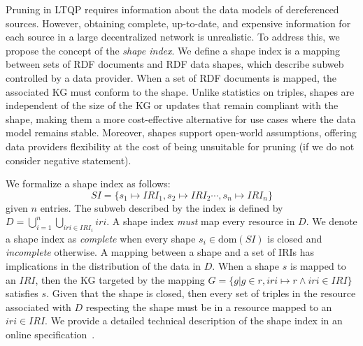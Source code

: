 Pruning in LTQP requires information about the data models of dereferenced sources.
However, obtaining complete, up-to-date, and expensive information for each source in a large decentralized network is unrealistic.
To address this, we propose the concept of the \emph{shape index}. 
We define a shape index is a mapping between sets of RDF documents and RDF data shapes, which describe subweb controlled by a data provider.
When a set of RDF documents is mapped, the associated KG must conform to the shape.
Unlike statistics on triples, shapes are independent of the size of the KG or updates that remain compliant with the shape, making them a more cost-effective alternative for use cases where the data model remains stable. 
Moreover, shapes support open-world assumptions, offering data providers flexibility at the cost of being unsuitable for pruning (if we do not consider negative statement).

We formalize a shape index as follows:
\begin{equation}\label{eq:shapeIndex}
   SI = \{s_1 \mapsto IRI_1, s_2 \mapsto IRI_2 \cdots, s_n \mapsto IRI_n\}
\end{equation}
given $n$ entries.
The subweb described by the index is defined by $D = \bigcup_{i=1}^{n} \bigcup_{iri \in IRI_i} iri$.
A shape index \emph{must} map every resource in $D$.
We denote a shape index as \emph{complete} when every shape $s_i \in \text{dom}(SI)$ is closed and \emph{incomplete} otherwise.
A mapping between a shape and a set of IRIs has implications in the distribution of the data in $D$.
When a shape $s$ is mapped to an $IRI$, then the KG targeted by the mapping $G = \{g | g \in r, iri \mapsto r \land iri \in IRI\}$ satisfies $s$.
Given that the shape is closed, then every set of triples in the resource associated with $D$ respecting the shape must be in a resource mapped to an $iri \in IRI$.
We provide a detailed technical description of the shape index in an online specification~.


